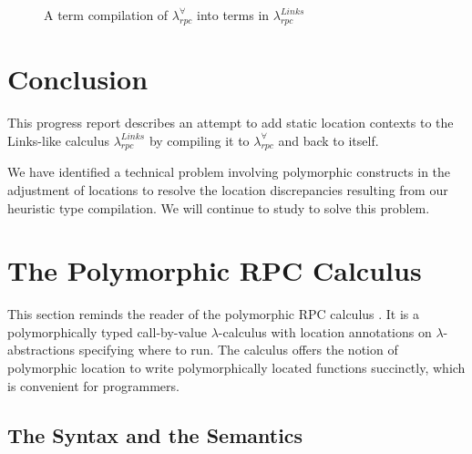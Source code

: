 \documentclass[a4paper]{article}
\theoremstyle{plain}
\theoremstyle{definition}
\newcommand{\rulewidth}{.8\linewidth}
\newcommand{\ruleverticalsephalf}{0.25cm}
\newcommand{\ruleverticalsep}{0.5cm}
\newcommand{\polyrpc}{$\lambda_{rpc}^{\forall}$\xspace}
\newcommand{\linksrpc}{$\lambda_{rpc}^{Links}$\xspace}
\newcommand{\subst}[2]{\{#1/#2\}}
\newcommand{\tyenv}{\Gamma}
\newcommand{\judgcomp}[2]{\llbracket#1\rrbracket_{#2}}
\newcommand{\polytycomp}[1]{T\llbracket#1\rrbracket}
\newcommand{\anncomp}[1]{Ann\llbracket#1\rrbracket}
\newcommand{\Loc}{Loc}
\begin{document}
\begin{figure}[t]
\caption{A term compilation of \polyrpc into terms in \linksrpc}
\label{fig:termcompilationback}
\end{figure}

\section{Conclusion}
\label{sec:conclusion}

%
This progress report describes an attempt to add static location
contexts to the Links-like calculus \linksrpc by compiling it to
\polyrpc and back to itself.

%
We have identified a technical problem involving polymorphic
constructs in the adjustment of locations to resolve the location
discrepancies resulting from our heuristic type compilation.
%
We will continue to study to solve this problem. 

	

	
\appendix
	
\section{The Polymorphic RPC Calculus}
\label{app:1}

This section reminds the reader of the polymorphic RPC calculus
\cite{CHOI:scp2020}.
%
It is a polymorphically typed call-by-value $\lambda$-calculus with
location annotations on $\lambda$-abstractions specifying where to
run.
%
The calculus offers the notion of polymorphic location to write
polymorphically located functions succinctly, which is convenient for
programmers.

\subsection{The Syntax and the Semantics}
\label{sec:polyrpc:syntax&semantics}
\end{document}
